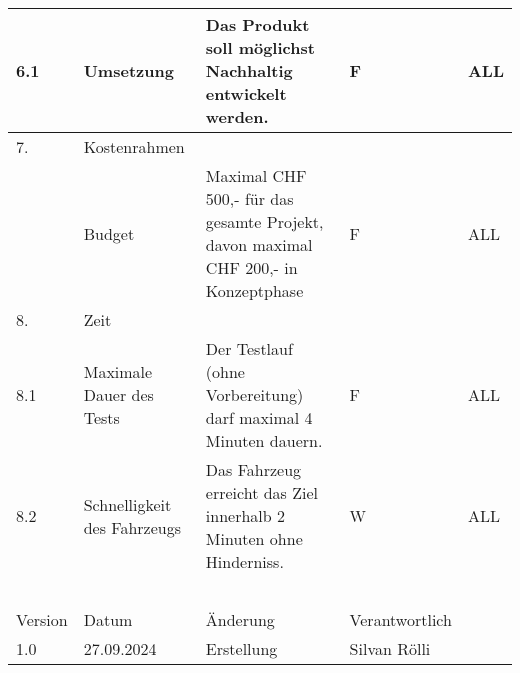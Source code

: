 \begin{longtable}[]{@{}lp{4cm}p{8cm}ll}
        6.1 & Umsetzung & Das Produkt soll möglichst Nachhaltig entwickelt werden. & F & ALL \\ \hline
        7. & Kostenrahmen & ~ & ~ & ~ \\ \hline
        ~ & Budget & Maximal CHF 500,- für das gesamte Projekt, davon maximal CHF 200,- in Konzeptphase & F & ALL \\ \hline
        8. & Zeit & ~ & ~ & ~ \\ \hline
        8.1 & Maximale Dauer des Tests & Der Testlauf (ohne Vorbereitung) darf maximal 4 Minuten dauern. & F & ALL \\ \hline
        8.2 & Schnelligkeit des Fahrzeugs & Das Fahrzeug erreicht das Ziel innerhalb 2 Minuten ohne Hinderniss. & W & ALL \\ \hline
        ~ & ~ & ~ & ~ & ~ \\ \hline
        Version & Datum & Änderung & Verantwortlich & ~ \\ \hline
        1.0 & 27.09.2024 & Erstellung & Silvan Rölli \\ \hline
\end{longtable}